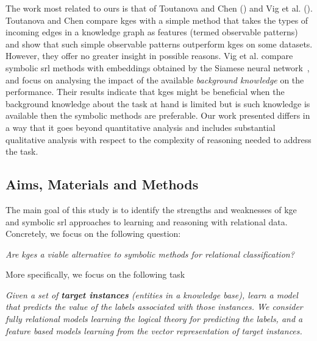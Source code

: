 The work most related to ours is that of Toutanova and Chen (\cite{toutanova2015observed}) and Vig et al. (\cite{VigILP2017}).
Toutanova and Chen compare \gls{kge}s with a simple method that takes the types of incoming edges in a knowledge graph as features (termed observable patterns) and show that such simple observable patterns outperform \gls{kge}s on some datasets.
However, they offer no greater insight in possible reasons.
Vig et al.  compare symbolic \gls{srl} methods with embeddings obtained by the Siamese neural network~\cite{Bromley:1993:SVU:2987189.2987282}, and focus on analysing the impact of the available \textit{background knowledge} on the performance.
Their results indicate that \gls{kge}s might be beneficial when the background knowledge about the task at hand is limited but is such knowledge is available then the symbolic methods are preferable.
Our work presented differs in a way that it goes beyond quantitative analysis and includes substantial qualitative analysis with respect to the complexity of reasoning needed to address the task.



\subsection{Aims, Materials and Methods}

The main goal of this study is to identify the strengths and weaknesses of  \gls{kge} and symbolic \gls{srl} approaches to learning and reasoning with relational data.
Concretely, we focus on the following question:

\begin{displayquote}
\textit{Are \gls{kge}s a viable alternative to symbolic methods for relational classification?}
\end{displayquote}


\noindent More specifically, we focus on the following task

\begin{displayquote}
\textit{Given a set of \textbf{target instances} (entities in a knowledge base), learn a model that predicts the value of the labels associated with those instances. We consider fully relational models learning the logical theory for predicting the labels, and a feature based models learning from the vector representation of target instances.}
\end{displayquote}


